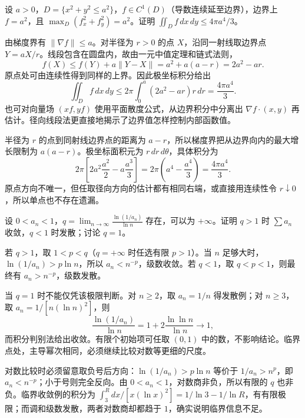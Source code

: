 \documentclass[12pt,fontset=fandol]{ctexart}
\begin{document}
\begin{example}\label{nm-final9-6}
设 $a>0$，$D=\{x^2+y^2\leq a^2\}$，$f\in C^1(D)$（导数连续延至边界），边界上 $f=a^2$，且 $\max_D(f_x^2+f_y^2)=a^2$。证明 $\displaystyle\iint_D f\,dx\,dy\leq4\pi a^4/3$。
\end{example}
\begin{solve}
由梯度界有 $\|\nabla f\|\leq a$。对半径为 $r>0$ 的点 $X$，沿同一射线取边界点 $Y=aX/r$。线段包含在圆盘内，故由一元中值定理和链式法则，
\[
 f(X)\leq f(Y)+a\|Y-X\|=a^2+a(a-r)=2a^2-ar.
\]
原点处可由连续性得到同样的上界。因此极坐标积分给出
\[
 \iint_D f\,dx\,dy\leq2\pi\int_0^a(2a^2-ar)r\,dr
 =\frac{4\pi a^4}{3}.
\]
也可对向量场 $(xf,yf)$ 使用平面散度公式，从边界积分中分离出 $\nabla f\cdot(x,y)$ 再估计。径向线段法更直接地揭示了边界值怎样控制内部函数值。

半径为 $r$ 的点到同射线边界点的距离为 $a-r$，所以梯度界把从边界向内的最大增长限制为 $a(a-r)$。极坐标面积元为 $r\,dr\,d\theta$，具体积分为
\[
2\pi\left[2a^2\frac{a^2}{2}-a\frac{a^3}{3}\right]
=2\pi\left(a^4-\frac{a^4}{3}\right)=\frac{4\pi a^4}{3}.
\]
原点方向不唯一，但任取径向方向的估计都有相同右端，或直接用连续性令 $r\downarrow0$，所以单点也不存在遗漏。

\end{solve}

\begin{example}\label{nm-final9-7}
设 $0<a_n<1$，$\displaystyle q=\lim_{n\to\infty}\frac{\ln(1/a_n)}{\ln n}$ 存在，可以为 $+\infty$。证明 $q>1$ 时 $\sum a_n$ 收敛，$q<1$ 时发散；讨论 $q=1$。
\end{example}
\begin{solve}
若 $q>1$，取 $1<p<q$（$q=+\infty$ 时任选有限 $p>1$）。当 $n$ 足够大时，$\ln(1/a_n)>p\ln n$，所以 $a_n<n^{-p}$，级数收敛。若 $q<1$，取 $q<p<1$，则最终有 $a_n>n^{-p}$，级数发散。

当 $q=1$ 时不能仅凭该极限判断。对 $n\geq2$，取 $a_n=1/n$ 得发散例；对 $n\geq3$，取 $a_n=1/[n(\ln n)^2]$，则
\[
 \frac{\ln(1/a_n)}{\ln n}=1+2\frac{\ln\ln n}{\ln n}\to1,
\]
而积分判别法给出收敛。有限个初始项可任取 $(0,1)$ 中的数，不影响结论。临界点处，主导幂次相同，必须继续比较对数等更细的尺度。

对数比较时必须留意取负号后方向：$\ln(1/a_n)>p\ln n$ 等价于 $1/a_n>n^p$，即 $a_n<n^{-p}$；小于号则完全反向。由 $0<a_n<1$，对数商非负，所以有限的 $q$ 也非负。临界收敛例的积分为 $\int_3^Rdx/[x(\ln x)^2]=1/\ln3-1/\ln R$，有有限极限；而调和级数发散，两者对数商却都趋于 $1$，确实说明临界信息不足。

\end{solve}
\end{document}
